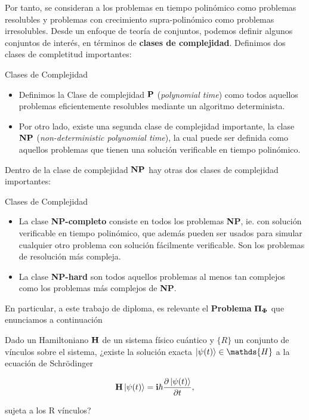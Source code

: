 \documentclass{report} %
\numberwithin{equation}{section}
\begin{document}
Por tanto, se consideran a los problemas en tiempo polinómico como problemas resolubles y problemas con crecimiento supra-polinómico como problemas irresolubles. Desde un enfoque de teoría de conjuntos, podemos definir algunos conjuntos de interés, en términos de \textbf{clases de complejidad}. Definimos dos clases de completitud importantes: 

\begin{tcolorbox}{Clases de Complejidad}

\begin{itemize}
    \item Definimos la Clase de complejidad ${\bf P}$ (\textit{polynomial time}) como todos aquellos problemas eficientemente resolubles mediante un algoritmo determinista. 
    \item Por otro lado, existe una segunda clase de complejidad importante, la clase ${\bf NP}$ (\textit{non-deterministic polynomial time}), la cual puede ser definida como aquellos problemas que tienen una solución verificable en tiempo polinómico.
\end{itemize}
\end{tcolorbox}

Dentro de la clase de complejidad ${\bf NP}$ hay otras dos clases de complejidad importantes: 

\begin{tcolorbox}{Clases de Complejidad}

\begin{itemize}
    \item La clase \textbf{NP-completo} consiste en todos los problemas \textbf{NP}, ie. con solución verificable en tiempo polinómico, que además pueden ser usados para simular cualquier otro problema con solución fácilmente verificable. Son los problemas de resolución más compleja.
    \item La clase \textbf{NP-hard} son todos aquellos problemas al menos tan complejos como los problemas más complejos de \textbf{NP}.
\end{itemize}
\end{tcolorbox}

\textnormal{  } \newline

En particular, a este trabajo de diploma, es relevante el \textbf{Problema} ${\bf \Pi_{\Phi}}$ que enunciamos a continuación

\begin{tcolorbox}[colback=red!5!white, colframe=red!50!black, title= \textbf{Problema} ${\bf \Pi_{\Phi}}$ ]

Dado un Hamiltoniano ${\bf H}$ de un sistema físico cuántico y $\{R\}$ un conjunto de vínculos sobre el sistema, ¿existe la solución exacta $\ket{\psi(t)} \in \mathds{H}$ a la ecuación de Schrödinger 

$$
{\bf H} \ket{\psi(t)} = {\bf i} \hbar \frac{\partial\ket{\psi(t)}}{\partial t},
$$

sujeta a los R vínculos?
\end{tcolorbox}
\end{document}
